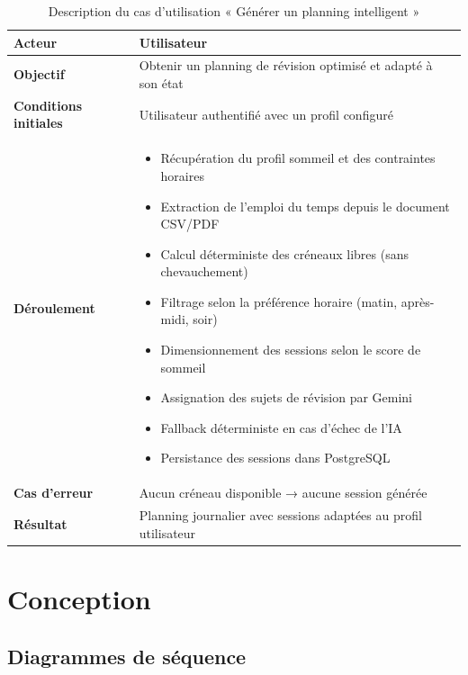 \begin{table}[H]
\centering
\renewcommand{\arraystretch}{1.2}
\begin{tabular}{|p{4cm}|p{10cm}|}
\hline
\textbf{Acteur} & Utilisateur \\ \hline

\textbf{Objectif} & Obtenir un planning de révision optimisé et adapté à son état \\ \hline

\textbf{Conditions initiales} & Utilisateur authentifié avec un profil configuré \\ \hline

\textbf{Déroulement} &
\begin{itemize}
    \item Récupération du profil sommeil et des contraintes horaires
    \item Extraction de l'emploi du temps depuis le document CSV/PDF
    \item Calcul déterministe des créneaux libres (sans chevauchement)
    \item Filtrage selon la préférence horaire (matin, après-midi, soir)
    \item Dimensionnement des sessions selon le score de sommeil
    \item Assignation des sujets de révision par Gemini
    \item Fallback déterministe en cas d'échec de l'IA
    \item Persistance des sessions dans PostgreSQL
\end{itemize} \\ \hline

\textbf{Cas d'erreur} & Aucun créneau disponible → aucune session générée \\ \hline

\textbf{Résultat} & Planning journalier avec sessions adaptées au profil utilisateur \\ \hline
\end{tabular}
\caption{Description du cas d'utilisation « Générer un planning intelligent »}
\label{tab:uc_planning}
\end{table}

\section{Conception}
\subsection{Diagrammes de séquence}

